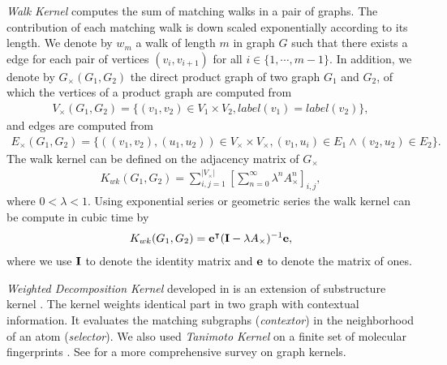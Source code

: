 {%
\textit{Walk Kernel} \citep{Kashima03marginalized,Gartner03a} computes the sum of matching walks in a pair of graphs. 
The contribution of each matching walk is down scaled exponentially according to its length.  
We denote by $w_m$ a walk of length $m$ in graph $G$ such that there exists a edge for each pair of vertices $(v_i,v_{i+1})$ for all $i\in\{1,\cdots,m-1\}$.
In addition, we denote by $G_{\times}(G_1,G_2)$ the direct product graph of two graph $G_1$ and $G_2$, of which the vertices of a product graph are computed from 
\begin{align*}
	V_{\times}(G_1,G_2) = \{(v_1,v_2)\in V_1\times V_2, label(v_1)=label(v_2)\},
\end{align*}
and edges are computed from
\begin{align*}
	E_{\times}(G_1,G_2) = \{((v_1,v_2),(u_1,u_2))\in V_{\times}\times V_{\times},(v_1,u_i)\in E_1\wedge (v_2,u_2)\in E_2\}.
\end{align*}
The walk kernel can be defined on the adjacency matrix of $G_{\times}$
\begin{align*}
	K_{wk}(G_1,G_2) = \sum_{i,j=1}^{|V_{\times}|}\left[\sum_{n=0}^{\infty}\lambda^{n}A_{\times}^n\right]_{i,j},
\end{align*}
where $0<\lambda<1$.
Using exponential series or geometric series the walk kernel can be compute in cubic time \citep{Gartner03a} by
\begin{align*}
	K_{wk}(G_1,G_2) = \mathbf {e}^{\intercal}(\mathbf{I}-\lambda A_{\times})^{-1}\mathbf {e},
\end{align*}
where we use $\mathbf{I}$ to denote the identity matrix and $\mathbf {e}$ to denote the matrix of ones.

\textit{Weighted Decomposition Kernel} developed in \citep{Menchetti05weighted,Ceroni08classification} is an extension of substructure kernel \citep{Haussler99convolution}.
The kernel weights identical part in two graph with contextual information.
It evaluates the matching subgraphs (\textit{contextor}) in the neighborhood of an atom (\textit{selector}).
We also used \textit{Tanimoto Kernel} \citep{Ralaivola05graph} on a finite set of molecular fingerprints \citep{Wang09pubchem}.
See \citep{Vishwanathan10graph} for a more comprehensive survey on graph kernels.

}
